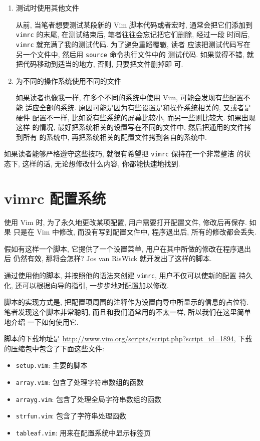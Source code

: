 \begin{enumerate}
    \item 测试时使用其他文件

    从前, 当笔者想要测试某段新的 Vim 脚本代码或者宏时, 通常会把它们添加到
    \texttt{vimrc} 的末尾, 在测试结束后, 笔者往往会忘记把它们删除, 经过一段
    时间后, \texttt{vimrc} 就充满了我的测试代码. 为了避免重蹈覆辙, 读者
    应该把测试代码写在另一个文件中, 然后用 \texttt{source} 命令执行文件中的
    测试代码. 如果觉得不错, 就把代码移动到适当的地方, 否则, 只要把文件删掉即
    可.

	\item 为不同的操作系统使用不同的文件

	如果读者也像我一样, 在多个不同的系统中使用 Vim, 可能会发现有些配置不能
	适应全部的系统. 原因可能是因为有些设置是和操作系统相关的, 又或者是硬件
	配置不一样, 比如说有些系统的屏幕比较小, 而另一些则比较大. 如果出现这样
	的情况, 最好把系统相关的设置写在不同的文件中, 然后把通用的文件拷到所有
	的系统中, 再把系统相关的配置文件拷到各自的系统中.
\end{enumerate}

如果读者能够严格遵守这些技巧, 就很有希望把 \texttt{vimrc} 保持在一个非常整洁
的状态下, 这样的话, 无论想修改什么内容, 你都能快速地找到.

\section{vimrc 配置系统}
\label{sec:a_vimrc_setup_system}

使用 Vim 时, 为了永久地更改某项配置, 用户需要打开配置文件, 修改后再保存. 如果
只是在 Vim 中修改, 而没有写到配置文件中, 程序退出后, 所有的修改都会丢失.

假如有这样一个脚本, 它提供了一个设置菜单, 用户在其中所做的修改在程序退出后
仍然有效, 那将会怎样? Jos van RisWick 就开发出了这样的脚本.

通过使用他的脚本, 并按照他的语法来创建 \texttt{vimrc}, 用户不仅可以使新的配置
持久化, 还可以根据向导的指引, 一步步地对配置加以修改.

脚本的实现方式是, 把配置项周围的注释作为设置向导中所显示的信息的占位符.
笔者发现这个脚本非常聪明, 而且和我们通常用的不太一样, 所以我们在这里简单地介绍
一下如何使用它.

脚本的下载地址是 \url{http://www.vim.org/scripts/script.php?script_id=1894},
下载的压缩包中包含了下面这些文件:
\begin{itemize}
  \item \texttt{setup.vim}: 主要的脚本
  \item \texttt{array.vim}: 包含了处理字符串数组的函数
  \item \texttt{arrayg.vim}: 包含了处理全局字符串数组的函数
  \item \texttt{strfun.vim}: 包含了字符串处理函数
  \item \texttt{tableaf.vim}: 用来在配置系统中显示标签页
\end{itemize}

